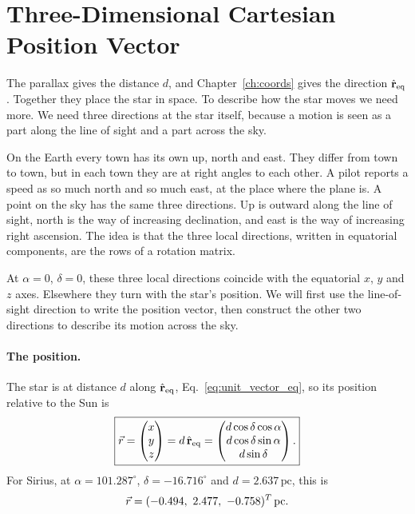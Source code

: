 \section{Three-Dimensional Cartesian Position Vector}
\label{as:sec:position}

The parallax gives the distance $d$, and Chapter~\ref{ch:coords} gives the direction $\hat{\mathbf r}_{\rm eq}$. Together they place the star in space. To describe how the star moves we need more. We need three directions at the star itself, because a motion is seen as a part along the line of sight and a part across the sky.

On the Earth every town has its own up, north and east. They differ from town to town, but in each town they are at right angles to each other. A pilot reports a speed as so much north and so much east, at the place where the plane is. A point on the sky has the same three directions. Up is outward along the line of sight, north is the way of increasing declination, and east is the way of increasing right ascension. The idea is that the three local directions, written in equatorial components, are the rows of a rotation matrix.

At $\alpha=0$, $\delta=0$, these three local directions coincide with the equatorial $x$, $y$ and $z$ axes. Elsewhere they turn with the star's position. We will first use the line-of-sight direction to write the position vector, then construct the other two directions to describe its motion across the sky.

\paragraph{The position.} The star is at distance $d$ along $\hat{\mathbf r}_{\rm eq}$, Eq.~\eqref{eq:unit_vector_eq}, so its position relative to the Sun is
\begin{equation}
	\boxed{\vec r = \begin{pmatrix} x \\ y \\ z \end{pmatrix} = d\,\hat{\mathbf r}_{\rm eq} = \begin{pmatrix} d\cos\delta\cos\alpha \\ d\cos\delta\sin\alpha \\ d\sin\delta \end{pmatrix}.}
	\label{eq:cartesian_pos_3d}
\end{equation}
For Sirius, at $\alpha=101.287^\circ$, $\delta=-16.716^\circ$ and $d=2.637\,\mathrm{pc}$, this is
\[
	\vecr=(-0.494,\ 2.477,\ -0.758)^T\,\mathrm{pc}.
\]

